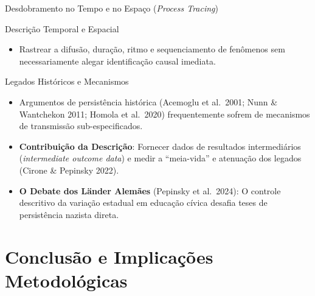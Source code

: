 \documentclass[
  ignorenonframetext,
  aspectratio=169,
  brazilian,
  t,
  10pt]{beamer}
\providecommand{\tightlist}{%
  \setlength{\itemsep}{0pt}\setlength{\parskip}{0pt}}
\begin{document}
\begin{frame}{Desdobramento no Tempo e no Espaço (\emph{Process
Tracing})}
\protect{}\label{desdobramento-no-tempo-e-no-espauxe7o-process-tracing}
\begin{block}{Descrição Temporal e Espacial}
\protect{}\label{descriuxe7uxe3o-temporal-e-espacial}
\begin{itemize}
\tightlist
\item
  Rastrear a difusão, duração, ritmo e sequenciamento de fenômenos sem
  necessariamente alegar identificação causal imediata.
\end{itemize}
\end{block}

\begin{block}{Legados Históricos e Mecanismos}
\protect{}\label{legados-histuxf3ricos-e-mecanismos}
\begin{itemize}
\tightlist
\item
  Argumentos de persistência histórica (Acemoglu et al.~2001; Nunn \&
  Wantchekon 2011; Homola et al.~2020) frequentemente sofrem de
  mecanismos de transmissão sub-especificados.
\item
  \textbf{Contribuição da Descrição}: Fornecer dados de resultados
  intermediários (\emph{intermediate outcome data}) e medir a
  ``meia-vida'' e atenuação dos legados (Cirone \& Pepinsky 2022).
\item
  \textbf{O Debate dos Länder Alemães} (Pepinsky et al.~2024): O
  controle descritivo da variação estadual em educação cívica desafia
  teses de persistência nazista direta.
\end{itemize}
\end{block}
\end{frame}

\section{Conclusão e Implicações
Metodológicas}\label{conclusuxe3o-e-implicauxe7uxf5es-metodoluxf3gicas}
\end{document}
